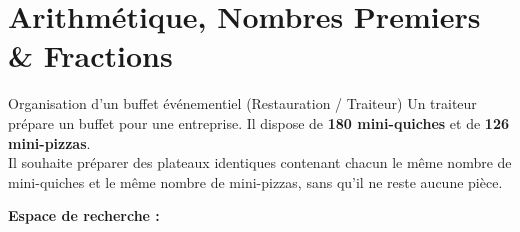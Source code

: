\chapter{Arithmétique, Nombres Premiers \& Fractions}

\begin{activite}{Organisation d'un buffet événementiel (Restauration / Traiteur)}
Un traiteur prépare un buffet pour une entreprise. Il dispose de \textbf{180 mini-quiches} et de \textbf{126 mini-pizzas}.\\
Il souhaite préparer des plateaux identiques contenant chacun le même nombre de mini-quiches et le même nombre de mini-pizzas, sans qu'il ne reste aucune pièce.

\begin{center}
\end{center}

\vspace{1mm}
\noindent\textbf{Espace de recherche :}
\lignesreponse[5]
\end{activite}

